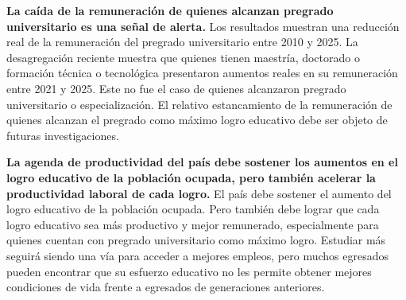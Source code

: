 
\textbf{La caída de la remuneración de quienes alcanzan pregrado universitario es una señal de alerta.} Los resultados muestran una reducción real de la remuneración del pregrado universitario entre 2010 y 2025. La desagregación reciente muestra que quienes tienen maestría, doctorado o formación técnica o tecnológica presentaron aumentos reales en su remuneración entre 2021 y 2025. Este no fue el caso de quienes alcanzaron pregrado universitario o especialización. El relativo estancamiento de la remuneración de quienes alcanzan el pregrado como máximo logro educativo debe ser objeto de futuras investigaciones.

\textbf{La agenda de productividad del país debe sostener los aumentos en el logro educativo de la población ocupada, pero también acelerar la productividad laboral de cada logro.} El país debe sostener el aumento del logro educativo de la población ocupada. Pero también debe lograr que cada logro educativo sea más productivo y mejor remunerado, especialmente para quienes cuentan con pregrado universitario como máximo logro. Estudiar más seguirá siendo una vía para acceder a mejores empleos, pero muchos egresados pueden encontrar que su esfuerzo educativo no les permite obtener mejores condiciones de vida frente a egresados de generaciones anteriores.


